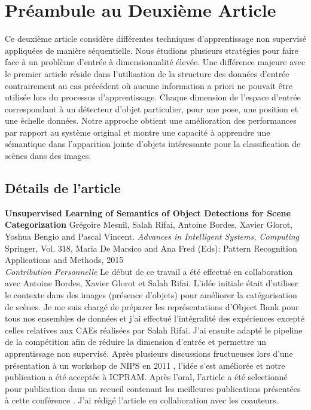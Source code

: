 \chapter{Pr\'{e}ambule au Deuxi\`{e}me Article }

Ce deuxième article considère différentes techniques d'apprentissage non
supervisé appliquées de manière séquentielle. Nous étudions plusieurs
stratégies pour faire face à un problème d'entrée à dimensionnalité élevée. Une
différence majeure avec le premier article réside dans l'utilisation de la
structure des données d'entrée contrairement au cas précédent où aucune
information a priori ne pouvait être utilisée lors du processus
d'apprentissage. Chaque dimension de l'espace d'entrée correspondant à un
détecteur d'objet particulier, pour une pose, une position et une échelle
données. Notre approche obtient une amélioration des performances par rapport au
système original et montre une capacité à apprendre une sémantique dans
l'apparition jointe d'objets intéressante pour la classification de scènes dans
des images.

\section{D\'{e}tails de l'article}

{ \bf Unsupervised Learning of Semantics of Object Detections for Scene
Categorization} Gr\'{e}goire Mesnil, Salah Rifai, Antoine Bordes, Xavier
Glorot, Yoshua Bengio and Pascal Vincent.  { \it Advances in Intelligent
Systems, Computing} Springer, Vol.  318, Maria De Marsico and Ana Fred (Eds):
Pattern Recognition Applications and Methods, 2015\\ 

{\it Contribution Personnelle} Le d\'{e}but de ce travail a \'{e}t\'{e}
effectu\'{e} en collaboration avec Antoine Bordes, Xavier Glorot et Salah
Rifai. L'id\'{e}e initiale \'{e}tait d'utiliser le contexte dans des images
(pr\'{e}sence d'objets) pour am\'{e}liorer la cat\'{e}gorisation de sc\`{e}nes.
Je me suis charg\'{e} de pr\'{e}parer les repr\'{e}sentations d'Object Bank
pour tous nos ensembles de données et j'ai effectu\'{e} l'int\'{e}gralit\'{e} des
exp\'{e}riences except\'{e} celles relatives aux CAEs r\'{e}alis\'{e}es par
Salah Rifai. J'ai ensuite adapt\'{e} le pipeline de la comp\'{e}tition afin de
r\'{e}duire la dimension d'entr\'{e}e et permettre un apprentissage non
supervis\'{e}.  Apr\`{e}s plusieurs discussions fructueuses lors
d'une pr\'{e}sentation \`{a} un workshop de NIPS en 2011
\citep{Mesnil-workshop-nips}, l'id\'{e}e s'est am\'{e}lior\'{e}e et notre
publication \citep{Mesnil-icpram} a \'{e}t\'{e} accept\'{e}e \`{a} ICPRAM.
Apr\`{e}s l'oral, l'article a \'{e}t\'{e} selectionn\'{e} pour publication dans
un recueil contenant les meilleures publications pr\'{e}sent\'{e}es \`{a} cette
conf\'{e}rence \citep{Mesnil-icpram-journal}. J'ai r\'{e}dig\'{e} l'article en
collaboration avec les coauteurs.

